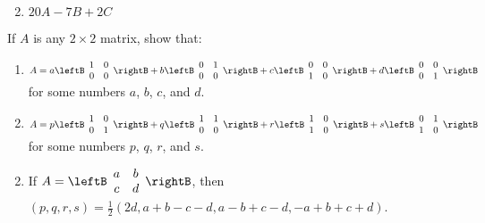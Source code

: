\begin{multicols}{2}
\begin{ex}
\begin{enumerate}[label={\alph*.}]
\end{enumerate}
\begin{sol}
\begin{enumerate}[label={\alph*.}]
\setcounter{enumi}{1}
\item  $20A - 7B + 2C$

\end{enumerate}
\end{sol}
\end{ex}


\begin{ex}
If $A$ is any $2 \times 2$ matrix, show that:


\begin{enumerate}[label={\alph*.}]
\item 
$A = a \leftB \begin{array}{rr}
1 & 0 \\
0 & 0
\end{array} \rightB + 
b \leftB \begin{array}{rr}
0 & 1 \\
0 & 0
\end{array} \rightB + 
c \leftB \begin{array}{rr}
0 & 0 \\
1 & 0
\end{array} \rightB + 
d \leftB \begin{array}{rr}
0 & 0 \\
0 & 1
\end{array} \rightB
$
 for some numbers $a$, $b$, $c$, and $d$.

\item 
$A = p \leftB \begin{array}{rr}
1 & 0 \\
0 & 1
\end{array} \rightB + 
q \leftB \begin{array}{rr}
1 & 1 \\
0 & 0
\end{array} \rightB + 
r \leftB \begin{array}{rr}
1 & 0 \\
1 & 0
\end{array} \rightB + 
s \leftB \begin{array}{rr}
0 & 1 \\
1 & 0
\end{array} \rightB
$
 for some numbers $p$, $q$, $r$, and $s$. 

\end{enumerate}
\begin{sol}
\begin{enumerate}[label={\alph*.}]
\setcounter{enumi}{1}
\item  If 
$A = \leftB \begin{array}{cc}
a & b \\
c & d
\end{array} \rightB$, then $(p, q, r, s) = \frac{1}{2}(2d, a + b - c - d, a - b + c - d, -a + b + c + d)$.


\end{enumerate}
\end{sol}
\end{ex}
\end{multicols}
